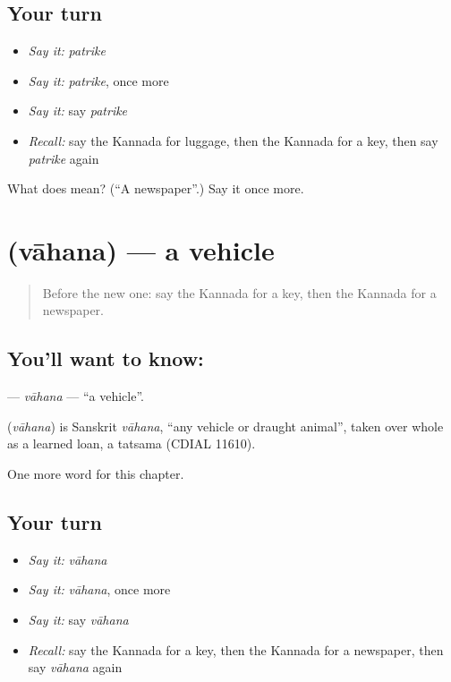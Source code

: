 \subsection*{Your turn}
\begin{itemize}
\raggedright
  \item \emph{Say it:} \emph{patrike}
  \item \emph{Say it:} \emph{patrike}, once more
  \item \emph{Say it:} say \emph{patrike}
  \item \emph{Recall:} say the Kannada for luggage, then the Kannada for a key, then say \emph{patrike} again
\end{itemize}

\begin{tcolorbox}[breakable,colback=teal!4,colframe=teal!35!black,title={Before you move on}]
What does  mean? (\textquotedblleft{}A newspaper\textquotedblright{}.) Say it once more.
\end{tcolorbox}
\section[\texorpdfstring{\kn{ವಾಹನ} (vāhana)}{ವಾಹನ (vāhana)}]{ (vāhana) — a vehicle}

\label{lesson:KA-C260-vahana}



\begin{quote}
Before the new one: say the Kannada for a key, then the Kannada for a newspaper.
\end{quote}

\subsection*{You'll want to know: }
\textbf{} — \emph{vāhana} — \textquotedblleft{}a vehicle\textquotedblright{}.

\begin{cousinweb}
\textbf{} (\emph{vāhana}) is Sanskrit \emph{vāhana}, \textquotedblleft{}any vehicle or draught animal\textquotedblright{}, taken over whole as a learned loan, a tatsama (CDIAL 11610).
\end{cousinweb}

\begin{grammarlens}[title={What you've built}]
One more word for this chapter.
\end{grammarlens}

\subsection*{Your turn}
\begin{itemize}
\raggedright
  \item \emph{Say it:} \emph{vāhana}
  \item \emph{Say it:} \emph{vāhana}, once more
  \item \emph{Say it:} say \emph{vāhana}
  \item \emph{Recall:} say the Kannada for a key, then the Kannada for a newspaper, then say \emph{vāhana} again
\end{itemize}

